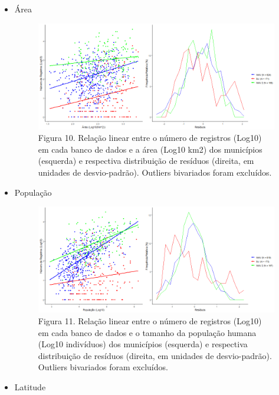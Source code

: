 \begin{itemize}
\begin{itemize}
\item Área


\begin{figure}[h!]
\centering
\includegraphics[width = 15cm]{Imagens/31213.png}
\\{\scriptsize Figura 10. Relação linear entre o número de registros (Log10) em cada banco de dados e a área (Log10 km2) dos municípios (esquerda) e respectiva distribuição de resíduos (direita, em unidades de desvio-padrão). Outliers bivariados foram excluídos.}
\end{figure}

\newpage

\item População

\begin{figure}[h!]
\centering
\includegraphics[width = 15cm]{Imagens/31313.png}
\\{\scriptsize Figura 11. Relação linear entre o número de registros (Log10) em cada banco de dados e o tamanho da população humana (Log10 indivíduos) dos municípios (esquerda) e respectiva distribuição de resíduos (direita, em unidades de desvio-padrão). Outliers bivariados foram excluídos.}
\end{figure}


\item Latitude


\end{itemize}
\end{itemize}
